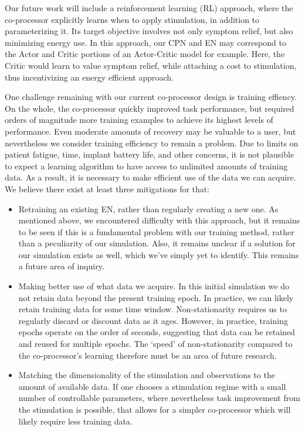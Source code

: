 \documentclass[12pt]{iopart}
\begin{document}
Our future work will include a reinforcement learning (RL) approach, where the co-processor
explicitly learns when to apply stimulation, in addition to parameterizing it. Its target
objective involves not only symptom relief, but also minimizing energy use. In this approach,
our CPN and EN may correspond to the Actor and Critic portions of an Actor-Critic model
for example. Here, the Critic would learn to value symptom relief, while attaching a cost
to stimulation, thus incentivizing an energy efficient approach.

One challenge remaining with our current co-processor design is training effiency.
On the whole, the co-processor quickly improved task performance, but required orders of
magnitude more training examples to achieve its highest levels of performance. Even
moderate amounts of recovery may be valuable to a user, but nevertheless we consider
training efficiency to remain a problem. Due to limits on patient fatigue, time, implant
battery life, and other concerns, it is not plausible to expect a learning algorithm
to have access to unlimited amounts of training data. As a result, it is necessary to
make efficient use of the data we can acquire. We believe there exist at least three
mitigations for that:

\begin{itemize}
	\item Retraining an existing EN, rather than regularly creating a new one. As
	      mentioned above, we encountered difficulty with this approach, but it remains
	      to be seen if this is a fundamental problem with our training method, rather
	      than a peculiarity of our simulation. Also, it remains unclear if a solution
	      for our simulation exists as well, which we've simply yet to identify. This
	      remains a future area of inquiry.
	\item Making better use of what data we acquire. In this initial simulation we do
	      not retain data beyond the present training epoch. In practice, we can likely
	      retain training data for some time window. Non-stationarity requires us to
	      regularly discard or discount data as it ages. However, in practice, training
	      epochs operate on the order of seconds, suggesting that data can be retained
	      and reused for multiple epochs. The `speed' of non-stationarity compared to
	      the co-processor's learning therefore must be an area of future research.
	\item Matching the dimensionality of the stimulation and observations
	      to the amount of available data. If one chooses a stimulation regime with
	      a small number of controllable parameters, where nevertheless task improvement
	      from the stimulation is possible, that allows for a simpler co-processor which
	      will likely require less training data.
\end{itemize}
\end{document}
